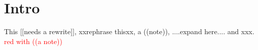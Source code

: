 \section{Intro}
This [[needs a rewrite]], xxrephrase thisxx, a ((note)), ....expand here.... and xxx.
\textcolor{red}{red with ((a note))}
